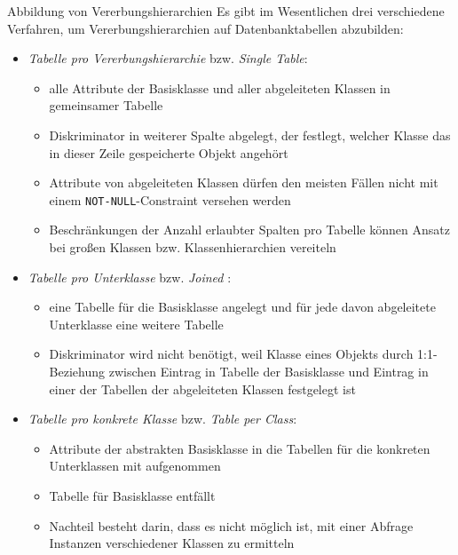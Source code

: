 \begin{defi}{Abbildung von Vererbungshierarchien}
    Es gibt im Wesentlichen drei verschiedene Verfahren, um Vererbungshierarchien auf Datenbanktabellen abzubilden:
    \begin{itemize}
        \item \emph{Tabelle pro Vererbungshierarchie} bzw. \emph{Single Table}:
              \begin{itemize}
                  \item alle Attribute der Basisklasse und aller abgeleiteten Klassen in gemeinsamer Tabelle
                  \item Diskriminator in weiterer Spalte abgelegt, der festlegt, welcher Klasse das in dieser Zeile gespeicherte Objekt angehört
                  \item Attribute von abgeleiteten Klassen dürfen den meisten Fällen nicht mit einem \texttt{NOT-NULL}-Constraint versehen werden
                  \item Beschränkungen der Anzahl erlaubter Spalten pro Tabelle können Ansatz bei großen Klassen bzw. Klassenhierarchien vereiteln
              \end{itemize}
        \item \emph{Tabelle pro Unterklasse} bzw. \emph{Joined }:
              \begin{itemize}
                  \item eine Tabelle für die Basisklasse angelegt und für jede davon abgeleitete Unterklasse eine weitere Tabelle
                  \item Diskriminator wird nicht benötigt, weil Klasse eines Objekts durch 1:1-Beziehung zwischen Eintrag in Tabelle der Basisklasse und Eintrag in einer der Tabellen der abgeleiteten Klassen festgelegt ist
              \end{itemize}
        \item \emph{Tabelle pro konkrete Klasse} bzw. \emph{Table per Class}:
              \begin{itemize}
                  \item Attribute der abstrakten Basisklasse in die Tabellen für die konkreten Unterklassen mit aufgenommen
                  \item  Tabelle für Basisklasse entfällt
                  \item  Nachteil besteht darin, dass es nicht möglich ist, mit einer Abfrage Instanzen verschiedener Klassen zu ermitteln
              \end{itemize}
    \end{itemize}
\end{defi}